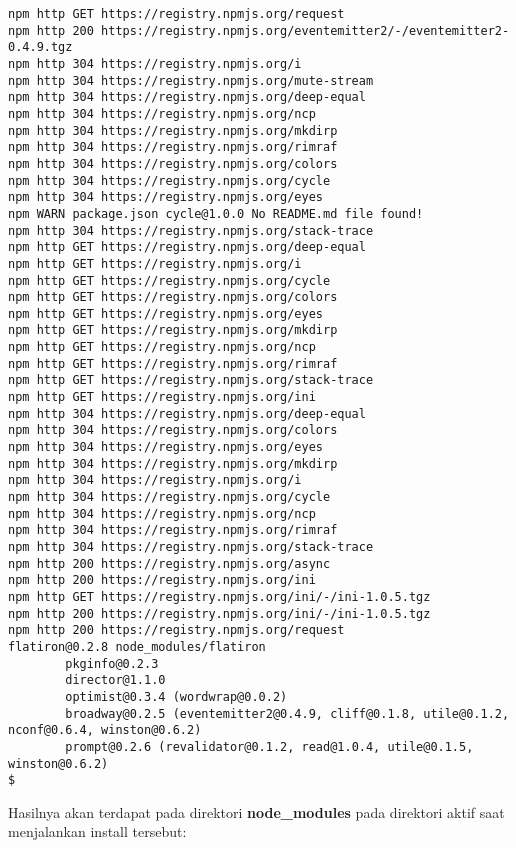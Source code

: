 \begin{lstlisting}
npm http GET https://registry.npmjs.org/request
npm http 200 https://registry.npmjs.org/eventemitter2/-/eventemitter2-0.4.9.tgz
npm http 304 https://registry.npmjs.org/i
npm http 304 https://registry.npmjs.org/mute-stream
npm http 304 https://registry.npmjs.org/deep-equal
npm http 304 https://registry.npmjs.org/ncp
npm http 304 https://registry.npmjs.org/mkdirp
npm http 304 https://registry.npmjs.org/rimraf
npm http 304 https://registry.npmjs.org/colors
npm http 304 https://registry.npmjs.org/cycle
npm http 304 https://registry.npmjs.org/eyes
npm WARN package.json cycle@1.0.0 No README.md file found!
npm http 304 https://registry.npmjs.org/stack-trace
npm http GET https://registry.npmjs.org/deep-equal
npm http GET https://registry.npmjs.org/i
npm http GET https://registry.npmjs.org/cycle
npm http GET https://registry.npmjs.org/colors
npm http GET https://registry.npmjs.org/eyes
npm http GET https://registry.npmjs.org/mkdirp
npm http GET https://registry.npmjs.org/ncp
npm http GET https://registry.npmjs.org/rimraf
npm http GET https://registry.npmjs.org/stack-trace
npm http GET https://registry.npmjs.org/ini
npm http 304 https://registry.npmjs.org/deep-equal
npm http 304 https://registry.npmjs.org/colors
npm http 304 https://registry.npmjs.org/eyes
npm http 304 https://registry.npmjs.org/mkdirp
npm http 304 https://registry.npmjs.org/i
npm http 304 https://registry.npmjs.org/cycle
npm http 304 https://registry.npmjs.org/ncp
npm http 304 https://registry.npmjs.org/rimraf
npm http 304 https://registry.npmjs.org/stack-trace
npm http 200 https://registry.npmjs.org/async
npm http 200 https://registry.npmjs.org/ini
npm http GET https://registry.npmjs.org/ini/-/ini-1.0.5.tgz
npm http 200 https://registry.npmjs.org/ini/-/ini-1.0.5.tgz
npm http 200 https://registry.npmjs.org/request
flatiron@0.2.8 node_modules/flatiron
        pkginfo@0.2.3
        director@1.1.0
        optimist@0.3.4 (wordwrap@0.0.2)
        broadway@0.2.5 (eventemitter2@0.4.9, cliff@0.1.8, utile@0.1.2, nconf@0.6.4, winston@0.6.2)
        prompt@0.2.6 (revalidator@0.1.2, read@1.0.4, utile@0.1.5, winston@0.6.2)
$
\end{lstlisting}

Hasilnya akan terdapat pada direktori \textbf{node_modules} pada direktori aktif saat menjalankan install tersebut:

